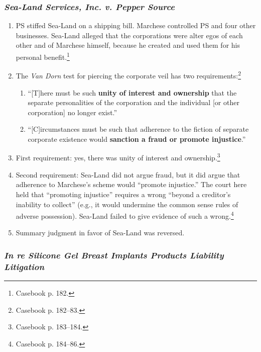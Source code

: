 \subsubsection{\emph{Sea-Land Services, Inc. v. Pepper Source}}

\begin{enumerate}
    \item PS stiffed Sea-Land on a shipping bill. Marchese controlled PS and 
    four other businesses. Sea-Land alleged that the corporations were alter 
    egos of each other and of Marchese himself, because he created and used 
    them for his personal benefit.\footnote{Casebook p. 182.}
    \item The \emph{Van Dorn} test for piercing the corporate veil has two 
    requirements:\footnote{Casebook p. 182--83.}
    \begin{enumerate}
        \item ``[T]here must be such \textbf{unity of interest and ownership} 
        that the separate personalities of the corporation and the individual 
        [or other corporation] no longer exist.''
        \item ``[C]ircumstances must be such that adherence to the fiction of 
        separate corporate existence would \textbf{sanction a fraud or promote 
        injustice}.''
    \end{enumerate}
    \item First requirement: yes, there was unity of interest and 
    ownership.\footnote{Casebook p. 183--184.}
    \item Second requirement: Sea-Land did not argue fraud, but it did argue 
    that adherence to Marchese's scheme would ``promote injustice.'' The court 
    here held that ``promoting injustice'' requires a wrong ``beyond a 
    creditor's inability to collect'' (e.g., it would undermine the common 
    sense rules of adverse possession). Sea-Land failed to give evidence of 
    such a wrong.\footnote{Casebook p. 184--86.}
    \item Summary judgment in favor of Sea-Land was reversed.
\end{enumerate}

\subsubsection{\emph{In re Silicone Gel Breast Implants Products Liability 
Litigation}}

